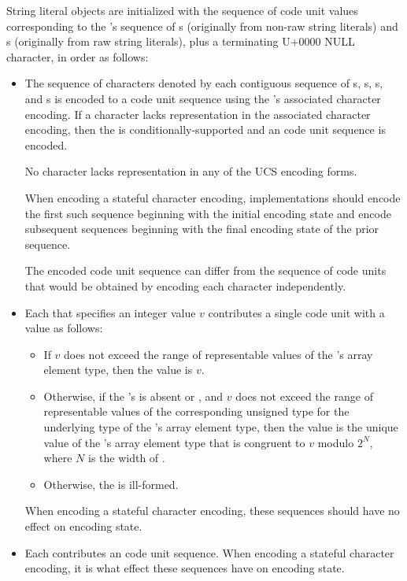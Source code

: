 \pnum
String literal objects are initialized with
the sequence of code unit values
corresponding to the 's sequence of
s (originally from non-raw string literals) and
s (originally from raw string literals),
plus a terminating U+0000 NULL character,
in order as follows:
\begin{itemize}
\item
The sequence of characters denoted by each contiguous sequence of
s,
s,
s, and
s
is encoded to a code unit sequence
using the 's associated character encoding.
If a character lacks representation in the associated character encoding,
then the  is conditionally-supported and
an
code unit sequence is encoded.
\begin{note}
No character lacks representation in any of the UCS encoding forms.
\end{note}
When encoding a stateful character encoding,
implementations should encode the first such sequence
beginning with the initial encoding state and
encode subsequent sequences
beginning with the final encoding state of the prior sequence.
\begin{note}
The encoded code unit sequence can differ from
the sequence of code units that would be obtained by
encoding each character independently.
\end{note}
\item
Each 
that specifies an integer value $v$
contributes a single code unit with a value as follows:
\begin{itemize}
\item
If $v$ does not exceed the range of representable values of
the 's array element type,
then the value is $v$.
\item
Otherwise,
if the 's 
is absent or , and
$v$ does not exceed the range of representable values of
the corresponding unsigned type for the underlying type of
the 's array element type,
then the value is the unique value of
the 's array element type 
that is congruent to $v$ modulo $2^N$, where $N$ is the width of .
\item
Otherwise, the  is ill-formed.
\end{itemize}
When encoding a stateful character encoding,
these sequences should have no effect on encoding state.
\item
Each 
contributes an
code unit sequence.
When encoding a stateful character encoding,
it is
what effect these sequences have on encoding state.
\end{itemize}

